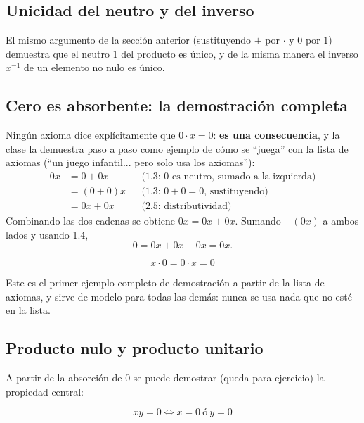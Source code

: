 \documentclass[12pt,a4paper]{article}
\begin{document}
\subsection{Unicidad del neutro y del inverso}

El mismo argumento de la sección anterior (sustituyendo $+$ por $\cdot$ y
$0$ por $1$) demuestra que el neutro $1$ del producto es único, y de la
misma manera el inverso $x^{-1}$ de un elemento no nulo es único.

\subsection{Cero es absorbente: la demostración completa}

Ningún axioma dice explícitamente que $0\cdot x = 0$: \textbf{es una
consecuencia}, y la clase la demuestra paso a paso como ejemplo de cómo se
``juega'' con la lista de axiomas (``un juego infantil... pero solo usa los
axiomas''):
\begin{align}
0x &= 0 + 0x &&\text{(1.3: } 0 \text{ es neutro, sumado a la izquierda)} \\
   &= (0+0)x &&\text{(1.3: } 0+0=0\text{, sustituyendo)} \\
   &= 0x + 0x &&\text{(2.5: distributividad)}
\end{align}
Combinando las dos cadenas se obtiene $0x = 0x+0x$. Sumando $-(0x)$ a ambos
lados y usando 1.4,
\[
0 = 0x + 0x - 0x = 0x.
\]

\begin{keybox}
\[
\boxed{x \cdot 0 = 0 \cdot x = 0}
\]
\end{keybox}

\begin{notebox}
Este es el primer ejemplo completo de demostración a partir de la lista de
axiomas, y sirve de modelo para todas las demás: nunca se usa nada que no
esté en la lista.
\end{notebox}

\subsection{Producto nulo y producto unitario}

A partir de la absorción de $0$ se puede demostrar (queda para ejercicio) la
propiedad central:

\begin{keybox}
\[
\boxed{xy = 0 \iff x=0 \ \text{ó} \ y=0}
\]
\end{keybox}
\end{document}
